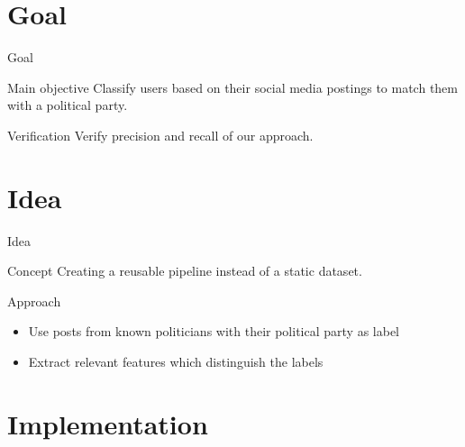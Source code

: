 \documentclass[aspectratio=169,xcolor=dvipsnames]{beamer}
\begin{document}
\section{Goal}

\begin{frame}{Goal}

    \begin{block}{Main objective}
        Classify users based on their social media postings to match them with a political party.
    \end{block}
    
    \begin{block}{Verification}
        Verify precision and recall of our approach.
    \end{block}
\end{frame}

\section{Idea}

\begin{frame}{Idea}

    \begin{block}{Concept}
        Creating a reusable pipeline instead of a static dataset.
    \end{block}

    \begin{block}{Approach}
        \begin{itemize}
            \item Use posts from known politicians with their political party as label
            \item Extract relevant features which distinguish the labels
        \end{itemize}
    \end{block}
    
\end{frame}

\section{Implementation}
\end{document}

